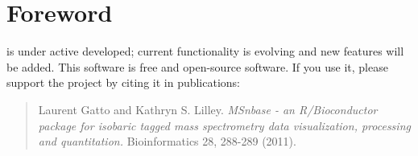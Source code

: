\section*{Foreword}


 is under active developed; current functionality is evolving and 
new features will be added. This software is free and open-source software. 
If you use it, please support the project by citing it in publications:

\begin{quote}
  Laurent Gatto and Kathryn S. Lilley. \textit{MSnbase - an R/Bioconductor 
    package for isobaric tagged mass spectrometry data visualization,
    processing and quantitation.} Bioinformatics 28, 288-289 (2011).
\end{quote}


